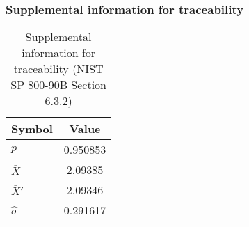 \documentclass[a3paper,xelatex,english]{bxjsarticle}
\begin{document}
\subsubsection{Supplemental information for traceability}
\renewcommand{\arraystretch}{1.8}
\begin{table}[h]
\caption{Supplemental information for traceability (NIST SP 800-90B Section 6.3.2)}
\begin{center}
\begin{tabular}{|l|c|}
\hline 
\rowcolor{anotherlightblue} %
Symbol				& Value \\ \hline 
$p$				& 0.950853\\ \hline 
$\bar{X}$ 		&  2.09385\\ \hline
$\bar{X}'$		&  2.09346\\ \hline
$\hat{\sigma}$		& 0.291617\\ \hline
\end{tabular}
\end{center}
\end{table}
\renewcommand{\arraystretch}{1.4}
\clearpage
\end{document}
